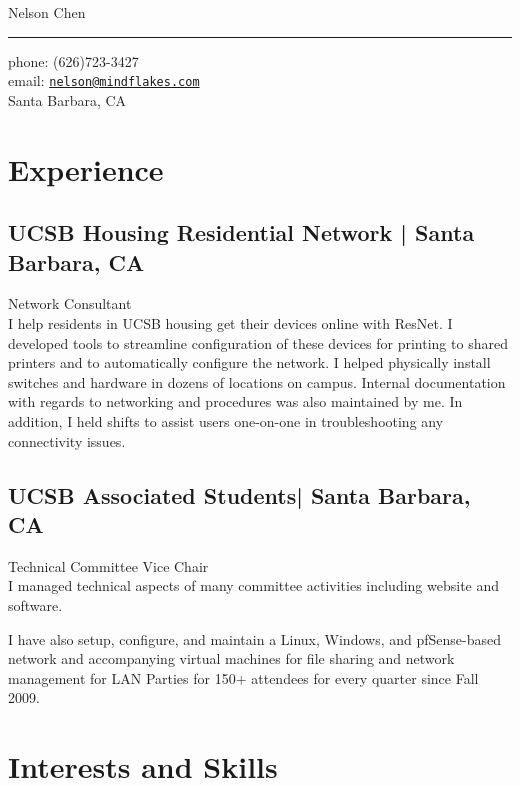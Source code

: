\documentclass[10pt,a4paper]{article}
\makeatletter
\def\myname{Nelson Chen}
\def\myemail{nelson@mindflakes.com}
\def\mycellphone{(626)723-3427}
\def\myaddress{Santa Barbara, CA}
\newcommand{\years}[1]{\marginnote{#1}}
\makeatother
\begin{document}
{\LARGE \myname}\\
\hrule
\vspace{0.2in}
{\large phone: \mycellphone}\\[.05cm]
{\large email: \href{mailto:\myemail}{\texttt{\myemail}}}\\[.05cm]
\myaddress
\vspace{0.5in}

\section*{Experience}

\subsection*{UCSB Housing Residential Network | {\footnotesize{Santa Barbara, CA}}}

\years{2009- \ldots} Network Consultant\\
I help residents in UCSB housing get their devices online with ResNet.
I developed tools to streamline configuration of these devices for printing to
shared printers and to automatically configure the network. I helped physically
install switches and hardware in dozens of locations on campus. Internal
documentation with regards to networking and procedures was also maintained by
me. In addition, I held shifts to assist users one-on-one in troubleshooting
any connectivity issues.


\subsection*{UCSB Associated Students| {\footnotesize{Santa Barbara, CA}}}

\years{2009-2012} Technical Committee Vice Chair \\
I managed technical aspects of many committee activities including website and
software.

I have also setup, configure, and maintain a Linux, Windows, and pfSense-based
network and accompanying virtual machines for file sharing and network
management for LAN Parties for 150+ attendees for every quarter since Fall 2009.

\section*{Interests and Skills}
\end{document}
